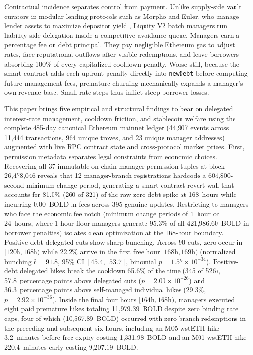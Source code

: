 Contractual incidence separates control from payment. Unlike supply-side vault curators in modular lending protocols such as Morpho and Euler, who manage lender assets to maximize depositor yield \citep{chitra2025curationary,zbandut2025institutionalizing,mancino2026sok}, Liquity V2 batch managers run liability-side delegation inside a competitive avoidance queue. Managers earn a percentage fee on debt principal. They pay negligible Ethereum gas to adjust rates, face reputational outflows after visible redemptions, and leave borrowers absorbing 100\% of every capitalized cooldown penalty. Worse still, because the smart contract adds each upfront penalty directly into \texttt{newDebt} before computing future management fees, premature churning mechanically expands a manager's own revenue base. Small rate steps thus inflict steep borrower losses.

This paper brings five empirical and structural findings to bear on delegated interest-rate management, cooldown friction, and stablecoin welfare using the complete 485-day canonical Ethereum mainnet ledger (44,907 events across 11,444 transactions, 964 unique troves, and 23 unique manager addresses) augmented with live RPC contract state and cross-protocol market prices. First, permission metadata separates legal constraints from economic choices. Recovering all 37 immutable on-chain manager permission tuples at block 26,478,046 reveals that 12 manager-branch registrations hardcode a 604,800-second minimum change period, generating a smart-contract revert wall that accounts for 81.0\% (260 of 321) of the raw zero-debt spike at 168~hours while incurring 0.00~BOLD in fees across 395 genuine updates. Restricting to managers who face the economic fee notch (minimum change periods of 1~hour or 24~hours, where 1-hour-floor managers generate 95.3\% of all 421,986.60~BOLD in borrower penalties) isolates clean optimization at the 168-hour boundary. Positive-debt delegated cuts show sharp bunching. Across 90 cuts, zero occur in $[120\text{h}, 168\text{h})$ while 22.2\% arrive in the first free hour $[168\text{h}, 169\text{h})$ (normalized bunching $b = 91.8$, 95\% CI $[45.4, 153.7]$, binomial $p = 1.57 \times 10^{-34}$). Positive-debt delegated hikes break the cooldown 65.6\% of the time (345 of 526), 57.8~percentage points above delegated cuts ($p = 2.00 \times 10^{-26}$) and 36.3~percentage points above self-managed individual hikes (29.3\%, $p = 2.92 \times 10^{-36}$). Inside the final four hours $[164\text{h}, 168\text{h})$, managers executed eight paid premature hikes totaling 11,979.39~BOLD despite zero binding rate caps, four of which (10,567.89~BOLD) occurred with zero branch redemptions in the preceding and subsequent six hours, including an M05 wstETH hike 3.2~minutes before free expiry costing 1,331.98~BOLD and an M01 wstETH hike 220.4~minutes early costing 9,207.19~BOLD.

